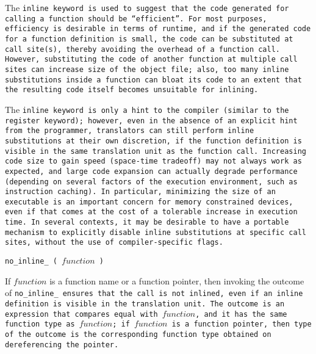 The \tt{inline} keyword is used to suggest that the code
generated for calling a function should be ``efficient''.
For most purposes, efficiency is desirable in terms of runtime,
and if the generated code for a function definition is small, the code can be
substituted at call site(s), thereby avoiding the overhead of a function call.
However, substituting the code of another function at multiple call
sites can increase size of the object file; also, too many inline
substitutions inside a function can bloat its code to an extent
that the resulting code itself becomes unsuitable for inlining.

\enlargethispage*{\baselineskip}
\pagebreak

The \tt{inline} keyword is only a hint to the compiler (similar
to the \tt{register} keyword); however, even in the absence of an
explicit hint from the programmer, translators can still perform
inline substitutions at their own discretion, if the function
definition is visible in the same translation unit as the function call.
Increasing code size to gain speed (space-time tradeoff)
may not always work as expected, and large code expansion
can actually degrade performance (depending on several factors
of the execution environment, such as instruction caching).
In particular, minimizing the size of an executable is an
important concern for memory constrained devices, even if that
comes at the cost of a tolerable increase in execution time.
In several contexts, it may be desirable to have a portable
mechanism to explicitly disable inline substitutions at
specific call sites, without the use of compiler-specific flags.


\tt{no_inline_ (} $function$ \tt{)}


If $function$ is a function name or a function pointer, then invoking
the outcome of \tt{no_inline_} ensures that the call is not inlined,
even if an inline definition is visible in the translation unit.
The outcome is an expression that compares equal with $function$,
and it has the same function type as $function$; if $function$ is
a function pointer, then type of the outcome is the corresponding
function type obtained on dereferencing the pointer.
